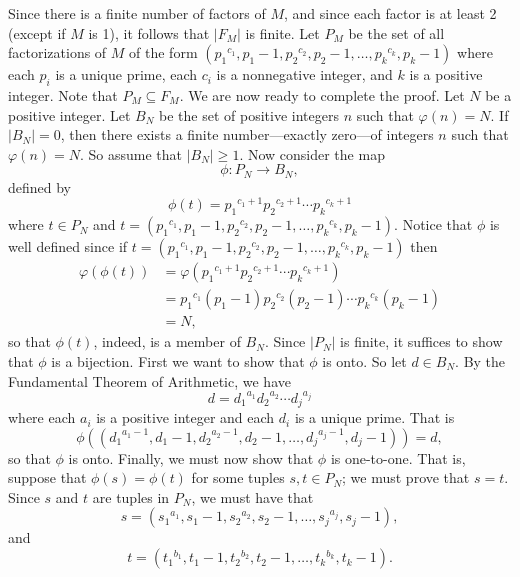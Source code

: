 \begin{enumerate}
      Since there is a finite number of factors of $M$, and since each factor is
      at least 2 (except if $M$ is 1), it follows that $|F_M|$ is finite. Let 
      $P_M$ be the set of all factorizations of $M$ of the form
      $({p_1}^{c_1}, p_1 - 1, {p_2}^{c_2}, p_2 - 1, \ldots,
      {p_k}^{c_k}, p_k - 1)$ where each $p_i$ is a unique prime, each $c_i$ is a
      nonnegative integer, and $k$ is a positive integer. Note that
      $P_M \subseteq F_M$. We are now ready to complete the proof. Let $N$ be a 
      positive integer. Let $B_N$ be the set of positive integers $n$ such that 
      $\varphi(n) = N$. If $|B_N| = 0$, then there exists a finite
      number---exactly zero---of integers $n$ such that $\varphi(n) = N$. So 
      assume that $|B_N| \ge 1$. Now consider the map
      $$\phi : P_N \rightarrow B_N,$$
      defined by
      $$\phi(t) = {p_1}^{c_1 + 1}{p_2}^{c_2 + 1}\cdots{p_k}^{c_k + 1}$$
      where $t \in P_N$ and $t = ({p_1}^{c_1}, p_1 - 1, {p_2}^{c_2}, p_2 - 1, 
      \ldots, {p_k}^{c_k}, p_k - 1)$. Notice that $\phi$ is well 
      defined since if $t = ({p_1}^{c_1}, p_1 - 1, {p_2}^{c_2}, p_2 - 1, \ldots,
      {p_k}^{c_k}, p_k - 1)$ then
      \begin{align*}
         \varphi(\phi(t)) &= \varphi({p_1}^{c_1 + 1}{p_2}^{c_2 + 1}\cdots
                             {p_k}^{c_k + 1}) \\
                          &= {p_1}^{c_1}(p_1 - 1){p_2}^{c_2}(p_2 - 1) \cdots
                             {p_k}^{c_k}(p_k - 1) \\
                    &= N,
      \end{align*}
      so that $\phi(t)$, indeed, is a member of $B_N$. Since $|P_N|$ is finite, 
      it suffices to show that $\phi$ is a bijection. First we want to show that
      $\phi$ is onto. So let $d \in B_N$. By the Fundamental Theorem of
      Arithmetic, we have
      $$d = {d_1}^{a_1}{d_2}^{a_2}\cdots{d_j}^{a_j}$$
      where each $a_i$ is a positive integer and each $d_i$ is a unique prime.
      That is
      $$\phi(({d_1}^{a_1 - 1}, d_1 - 1, {d_2}^{a_2 - 1}, d_2 - 1, \ldots,
      {d_j}^{a_j - 1}, d_j - 1)) = d,$$
      so that $\phi$ is onto. Finally, we must now show that $\phi$ is
      one-to-one. That is, suppose that $\phi(s) = \phi(t)$ for some tuples
      $s, t \in P_N$; we must prove that $s = t$. Since $s$ and $t$ are tuples
      in $P_N$, we must have that
      $$s = ({s_1}^{a_1}, s_1 - 1, {s_2}^{a_2}, s_2 - 1, \ldots, {s_j}^{a_j}, 
            s_j - 1),$$
      and
      $$t = ({t_1}^{b_1}, t_1 - 1, {t_2}^{b_2}, t_2 - 1, \ldots, {t_k}^{b_k}, 
      t_k - 1).$$


\end{enumerate}
